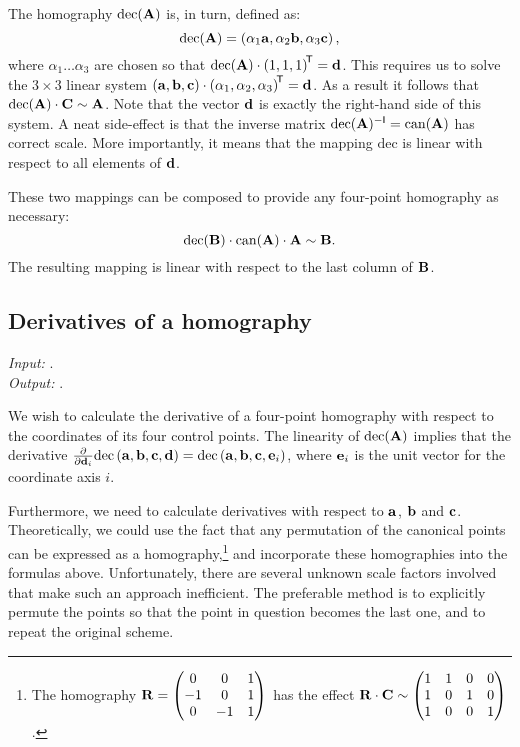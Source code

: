 The homography $\mathrm{dec}(\mathbf{A})$ is, in turn, defined as:
$$\mathrm{dec}(\mathbf{A}) = \left( \alpha_1 \mathbf{a}, \alpha_2 \mathbf{b}, \alpha_3 \mathbf{c} \right),$$
where $\alpha_1 \dots \alpha_3$ are chosen so that $\mathrm{dec}(\mathbf{A}) \cdot \left( 1, 1, 1 \right)^{\!\mathsf{T}} = \mathbf{d}$.
This requires us to solve the $3 \times 3$ linear system $\left(\mathbf{a}, \mathbf{b}, \mathbf{c} \right) \cdot \left(\alpha_1, \alpha_2, \alpha_3 \right) ^{\!\mathsf{T}} = \mathbf{d}$.
As a result it follows that $\mathrm{dec}(\mathbf{A}) \cdot \mathbf{C} \sim \mathbf{A}$.
Note that the vector $\mathbf{d}$ is exactly the right-hand side of this system.
A neat side-effect is that the inverse matrix $\mathrm{dec}(\mathbf{A}) ^{-\mathsf{I}} = \mathrm{can}(\mathbf{A})$ has correct scale. 
More importantly, it means that the mapping $\mathrm{dec}$ is linear with respect to all elements of $\mathbf{d}$.

These two mappings can be composed to provide any four-point homography as necessary:
$$\mathrm{dec}(\mathbf{B}) \cdot \mathrm{can}(\mathbf{A}) \cdot \mathbf{A} \sim \mathbf{B}.$$
The resulting mapping is linear with respect to the last column of $\mathbf{B}$.


\subsection{Derivatives of a homography}
\label{s.homderivatives}

\textit{Input:} .\\
\textit{Output:} .\\


We wish to calculate the derivative of a four-point homography with respect to the coordinates of its four control points.
The linearity of $\mathrm{dec}(\mathbf{A})$ implies that the derivative $\frac{\partial} {\partial \mathbf{d}_i} \mathrm{dec} \left( \mathbf{a}, \mathbf{b}, \mathbf{c}, \mathbf{d} \right) = \mathrm{dec} \left( \mathbf{a}, \mathbf{b}, \mathbf{c}, \mathbf{e}_i \right)$, where $\mathbf{e}_i$ is the unit vector for the coordinate axis $i$.

Furthermore, we need to calculate derivatives with respect to $\mathbf{a}$, $\mathbf{b}$ and $\mathbf{c}$.
Theoretically, we could use the fact that any permutation of the canonical points can be expressed as a homography,\footnote{
The homography $\mathbf{R} = \begin{pmatrix}
 0 & 0 & 1 \\
 -1 & 0 & 1 \\
 0 & -1 & 1
 \end{pmatrix}$ has the effect $\mathbf{R} \cdot \mathbf{C} \sim \begin{pmatrix}
 1 & 1 & 0 & 0 \\
 1 & 0 & 1 & 0 \\
 1 & 0 & 0 & 1
 \end{pmatrix}$.
} and incorporate these homographies into the formulas above.
Unfortunately, there are several unknown scale factors involved that make such an approach inefficient.
The preferable method is to explicitly permute the points so that the point in question becomes the last one, and to repeat the original scheme.

